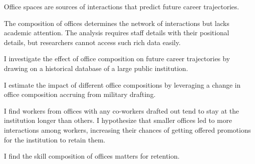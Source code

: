 \item Office spaces are sources of interactions that predict future career trajectories. 

\item The composition of offices determines the network of interactions but lacks academic attention. The analysis requires staff details with their positional details, but researchers cannot access such rich data easily.

\item I investigate the effect of office composition on future career trajectories by drawing on a historical database of a large public institution.

\item I estimate the impact of different office compositions by leveraging a change in office composition accruing from military drafting.

\item I find workers from offices with any co-workers drafted out tend to stay at the institution longer than others. I hypothesize that smaller offices led to more interactions among workers, increasing their chances of getting offered promotions for the institution to retain them.

\item I find the skill composition of offices matters for retention.